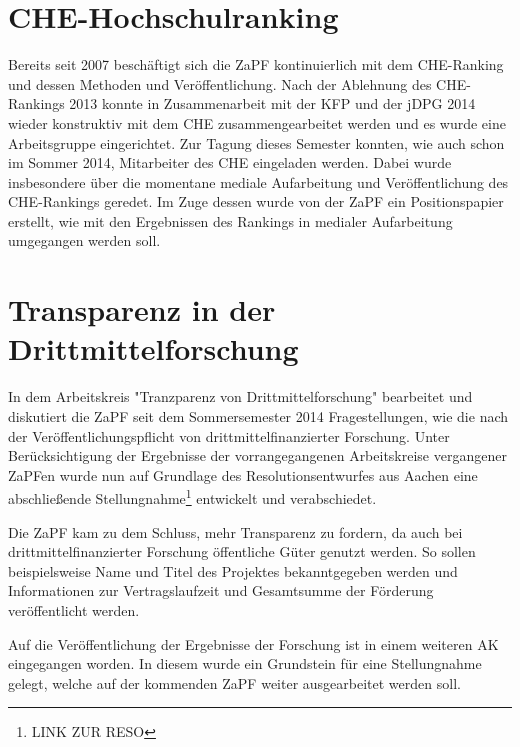 \section*{CHE-Hochschulranking}
Bereits seit 2007 beschäftigt sich die ZaPF kontinuierlich mit dem CHE-Ranking und dessen Methoden und Veröffentlichung. Nach der Ablehnung des CHE-Rankings 2013 konnte in Zusammenarbeit mit der KFP und der jDPG 2014 wieder konstruktiv mit dem CHE zusammengearbeitet werden und es wurde eine Arbeitsgruppe eingerichtet. Zur Tagung dieses Semester konnten, wie auch schon im Sommer 2014, Mitarbeiter des CHE eingeladen werden. Dabei wurde insbesondere über die momentane mediale Aufarbeitung und Veröffentlichung des CHE-Rankings geredet. Im Zuge dessen wurde von der ZaPF ein Positionspapier erstellt, wie mit den Ergebnissen des Rankings in medialer Aufarbeitung umgegangen werden soll.

\section*{Transparenz in der Drittmittelforschung}
In dem Arbeitskreis "Tranzparenz von Drittmittelforschung" bearbeitet und diskutiert die ZaPF seit dem Sommersemester 2014 Fragestellungen, wie die nach der Veröffentlichungspflicht von drittmittelfinanzierter Forschung. Unter Berücksichtigung der Ergebnisse der vorrangegangenen Arbeitskreise vergangener ZaPFen wurde nun auf Grundlage des Resolutionsentwurfes aus Aachen eine abschließende Stellungnahme\footnote{LINK ZUR RESO} entwickelt und verabschiedet.

Die ZaPF kam zu dem Schluss, mehr Transparenz zu fordern, da auch bei drittmittelfinanzierter Forschung öffentliche Güter genutzt werden. So sollen beispielsweise Name und Titel des Projektes bekanntgegeben werden und Informationen zur Vertragslaufzeit und Gesamtsumme der Förderung veröffentlicht werden.

Auf die Veröffentlichung der Ergebnisse der Forschung ist in einem weiteren AK eingegangen worden. In diesem wurde ein Grundstein für eine Stellungnahme gelegt, welche auf der kommenden ZaPF weiter ausgearbeitet werden soll.


